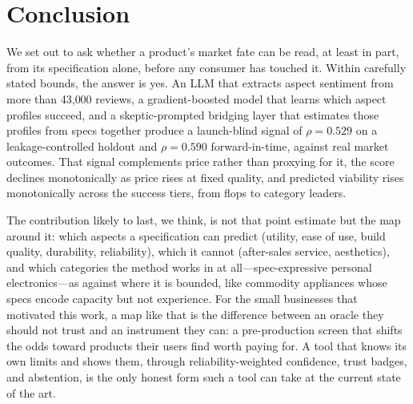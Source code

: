 \documentclass[journal]{IEEEtran}
\begin{document}
\section{Conclusion}
We set out to ask whether a product's market fate can be read, at least in part, from its specification alone, before any consumer has touched it. Within carefully stated bounds, the answer is yes. An LLM that extracts aspect sentiment from more than 43{,}000 reviews, a gradient-boosted model that learns which aspect profiles succeed, and a skeptic-prompted bridging layer that estimates those profiles from specs together produce a launch-blind signal of $\rho = 0.529$ on a leakage-controlled holdout and $\rho = 0.590$ forward-in-time, against real market outcomes. That signal complements price rather than proxying for it, the score declines monotonically as price rises at fixed quality, and predicted viability rises monotonically across the success tiers, from flops to category leaders.

The contribution likely to last, we think, is not that point estimate but the map around it: which aspects a specification can predict (utility, ease of use, build quality, durability, reliability), which it cannot (after-sales service, aesthetics), and which categories the method works in at all---spec-expressive personal electronics---as against where it is bounded, like commodity appliances whose specs encode capacity but not experience. For the small businesses that motivated this work, a map like that is the difference between an oracle they should not trust and an instrument they can: a pre-production screen that shifts the odds toward products their users find worth paying for. A tool that knows its own limits and shows them, through reliability-weighted confidence, trust badges, and abstention, is the only honest form such a tool can take at the current state of the art.



\end{document}
